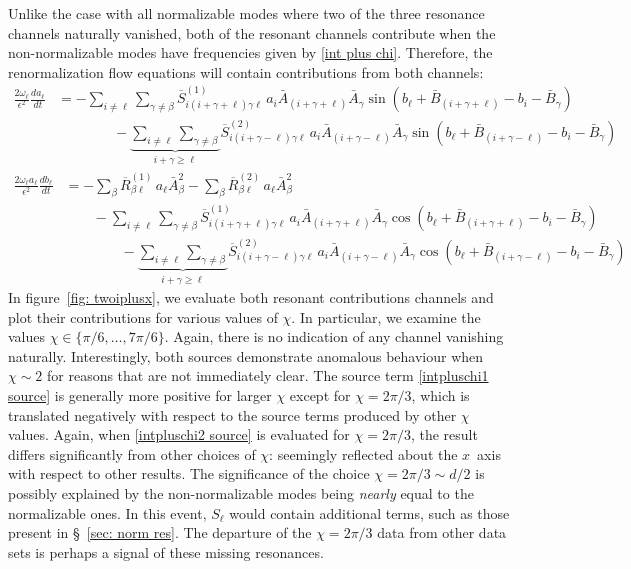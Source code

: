 \documentclass[letterpaper,11pt]{article}
\newcommand{\ol}{\omega_\ell}
\begin{document}
Unlike the case with all normalizable modes where two of the three resonance channels naturally vanished, both of the resonant channels contribute when the non-normalizable modes have frequencies given by \eqref{int plus chi}. Therefore, the renormalization flow equations will contain contributions from both channels:
\begin{align}
\frac{2 \ol}{\epsilon^2} \frac{d a_\ell}{d t} &= - \sum_{i \neq \ell} \sum_{\gamma \neq \beta} \overline{S}^{(1)}_{i (i + \gamma + \ell) \gamma \ell} \, a_i \bar A_{(i + \gamma + \ell)} \bar A_\gamma \sin \left( b_\ell + \bar B_{(i + \gamma + \ell)} - b_i - \bar B_\gamma \right) \nonumber \\
%
& \qquad \qquad -  \underbrace{\sum_{i \neq \ell} \sum_{\gamma \neq \beta}}_{i + \gamma \geq \ell} \overline{S}^{(2)}_{i (i + \gamma - \ell) \gamma \ell} \, a_i \bar A_{(i + \gamma - \ell)} \bar A_\gamma \sin \left( b_\ell + \bar B_{(i+\gamma - \ell)} - b_i - \bar B_\gamma \right)
\end{align}
\begin{align}
\frac{2 \ol a_\ell}{\epsilon^2} \frac{d b_\ell}{dt} &=  - \sum_\beta \overline{R}^{(1)}_{\beta \ell} \, a_\ell \bar A_\beta^2 - \sum_\beta \overline{R}^{(2)}_{\beta\ell} \, a_\ell \bar A_\beta^2 \nonumber \\
%
& \qquad - \sum_{i \neq \ell} \sum_{\gamma \neq \beta} \overline{S}^{(1)}_{i (i + \gamma + \ell) \gamma \ell} \, a_i \bar A_{(i + \gamma + \ell)} \bar A_\gamma \cos \left( b_\ell + \bar B_{(i + \gamma + \ell)} - b_i - \bar B_\gamma \right) \nonumber \\
%
& \qquad \qquad -  \underbrace{\sum_{i \neq \ell} \sum_{\gamma \neq \beta}}_{i + \gamma \geq \ell} \overline{S}^{(2)}_{i (i + \gamma - \ell) \gamma \ell} \, a_i \bar A_{(i + \gamma - \ell)} \bar A_\gamma \cos \left( b_\ell + \bar B_{(i+\gamma - \ell)} - b_i - \bar B_\gamma \right)
\end{align}
In figure~\ref{fig: twoiplusx}, we evaluate both resonant contributions channels and plot their contributions for various values of $\chi$. In particular, we examine the values $\chi \in \{ \pi/6, \ldots, 7\pi/6 \}$. Again, there is no indication of any channel vanishing naturally. Interestingly, both sources demonstrate anomalous behaviour when $\chi \sim 2$ for reasons that are not immediately clear. The source term \eqref{intpluschi1 source} is generally more positive for larger $\chi$ except for $\chi = 2 \pi / 3$, which is translated negatively with respect to the source terms produced by other $\chi$ values. Again, when \eqref{intpluschi2 source} is evaluated for $\chi = 2 \pi/3$, the result differs significantly from other choices of $\chi$: seemingly reflected about the $x$~axis with respect to other results. The significance of the choice $\chi = 2\pi / 3 \sim d / 2$ is possibly explained by the non-normalizable modes being \emph{nearly} equal to the normalizable ones. In this event, $S_\ell$ would contain additional terms, such as those present in \S~\!\ref{sec: norm res}. The departure of the $\chi = 2\pi/3$ data from other data sets is perhaps a signal of these missing resonances.
\end{document}
